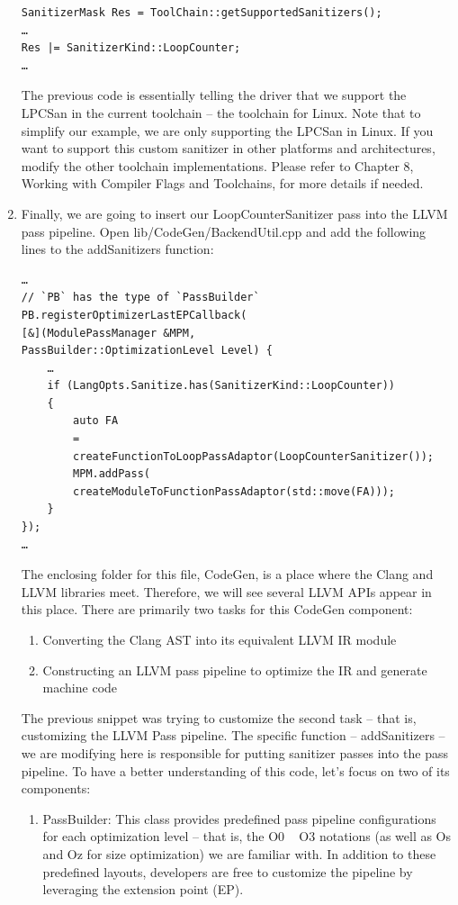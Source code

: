 \begin{enumerate}
\begin{lstlisting}[style=styleCXX]
SanitizerMask Res = ToolChain::getSupportedSanitizers();
…
Res |= SanitizerKind::LoopCounter;
…
\end{lstlisting}

The previous code is essentially telling the driver that we support the LPCSan in the current toolchain – the toolchain for Linux. Note that to simplify our example, we are only supporting the LPCSan in Linux. If you want to support this custom sanitizer in other platforms and architectures, modify the other toolchain implementations. Please refer to Chapter 8, Working with Compiler Flags and Toolchains, for more details if needed.


\item Finally, we are going to insert our LoopCounterSanitizer pass into the LLVM
pass pipeline. Open lib/CodeGen/BackendUtil.cpp and add the following
lines to the addSanitizers function:

\begin{lstlisting}[style=styleCXX]
…
// `PB` has the type of `PassBuilder`
PB.registerOptimizerLastEPCallback(
[&](ModulePassManager &MPM,
PassBuilder::OptimizationLevel Level) {
	…
	if (LangOpts.Sanitize.has(SanitizerKind::LoopCounter))
	{
		auto FA
		=
		createFunctionToLoopPassAdaptor(LoopCounterSanitizer());
		MPM.addPass(
		createModuleToFunctionPassAdaptor(std::move(FA)));
	}
});
…
\end{lstlisting}

The enclosing folder for this file, CodeGen, is a place where the Clang and LLVM libraries meet. Therefore, we will see several LLVM APIs appear in this place. There are primarily two tasks for this CodeGen component:

\begin{enumerate}[label=\alph*.]
\item Converting the Clang AST into its equivalent LLVM IR module
\item Constructing an LLVM pass pipeline to optimize the IR and generate machine code
\end{enumerate}

The previous snippet was trying to customize the second task – that is, customizing the LLVM Pass pipeline. The specific function – addSanitizers – we are modifying here is responsible for putting sanitizer passes into the pass pipeline. To have a better understanding of this code, let's focus on two of its components:

\begin{enumerate}[label=\roman*.]
\item PassBuilder: This class provides predefined pass pipeline configurations for each optimization level – that is, the O0 ~ O3 notations (as well as Os and Oz for size optimization) we are familiar with. In addition to these predefined layouts, developers are free to customize the pipeline by leveraging the extension point (EP).


\end{enumerate}
\end{enumerate}

